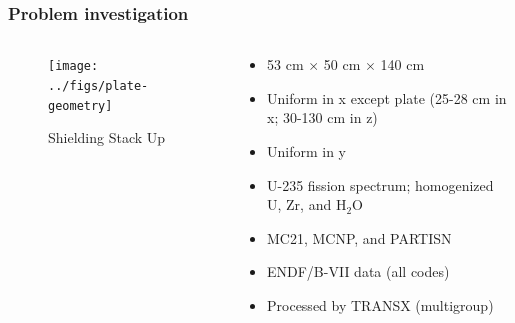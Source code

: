 \documentclass[xcolor=x11names,compress, handout]{beamer}
\renewcommand{\(}{\begin{columns}}
\renewcommand{\)}{\end{columns}}
\newcommand{\<}[1]{\begin{column}{#1}}
\renewcommand{\>}{\end{column}}
\begin{document}
\begin{frame}[fragile]
  \frametitle{Problem investigation}
  	\begin{columns}
  	\begin{column}{0.4\textwidth}
  	\begin{figure}
  		\texttt{[image: ../figs/plate-geometry]}
  		\caption{Shielding Stack Up}
  	\end{figure}
  	\end{column}
 	\begin{column}{0.6\textwidth}
	\begin{itemize}
	\item 53 cm $\times$ 50 cm $\times$ 140 cm 
	\item Uniform in x except plate (25-28 cm in x; 30-130 cm in z)
	\item Uniform in y
	\item U-235 fission spectrum; homogenized U, Zr, and H$_2$O
	\vspace*{1 em}
	\item MC21, MCNP, and PARTISN
	\item ENDF/B-VII data (all codes)
	\item Processed by TRANSX (multigroup)
	\end{itemize}
  	\end{column}
	\end{columns}
  
\end{frame}
\end{document}
